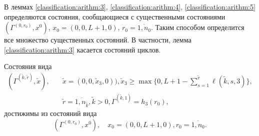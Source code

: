 В леммах \ref{classification:arithm:3},  \ref{classification:arithm:4},  \ref{classification:arithm:5} определяются состояния,  сообщающиеся с существенными состояниями $(\Gamma^{(0,  r_0)},  x^0)$,  $x_0=(0,  0,  L+1,  0)$,  $r_0=\overline{1,  n_0}$. Таким способом определится все множество существенных состояний. В частности,  лемма \ref{classification:arithm:3} касается состояний циклов.
\begin{lemma}\label{incycle:states}
Состояния вида 
\begin{align*}
    (\Gamma^{(\tilde{k},  \tilde{r})},  \tilde{x}),  \quad
&\tilde{x}=(0,  0,  \tilde{x}_3,  0)),  \tilde{x}_3\geqslant\max{\{0,  L+1-\sum_{s=1}^{\tilde{r}} \ell(\tilde{k},  s,  3)\}},  \\ &\tilde{r} = \overline{1,  n_{\tilde{k}}},  \tilde{k}>0,  \Gamma^{(\tilde{k},  1)}=h_3(r_0), 
\end{align*}
 достижимы из состояний вида
 $$(\Gamma^{(0,  r_0)},  x^0),  \quad x_0=(0,  0,  L+1,  0),  r_0=\overline{1,  n_0}.$$\label{classification:arithm:3}
\end{lemma}
